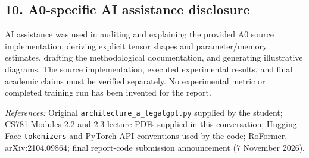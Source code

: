 \subsection{10. A0-specific AI assistance
disclosure}\label{a0-specific-ai-assistance-disclosure}

AI assistance was used in auditing and explaining the provided A0 source
implementation, deriving explicit tensor shapes and parameter/memory
estimates, drafting the methodological documentation, and generating
illustrative diagrams. The source implementation, executed experimental
results, and final academic claims must be verified separately. No
experimental metric or completed training run has been invented for the
report.

\emph{References:} Original \texttt{architecture\_a\_legalgpt.py}
supplied by the student; CS781 Modules 2.2 and 2.3 lecture PDFs supplied
in this conversation; Hugging Face \texttt{tokenizers} and PyTorch API
conventions used by the code; RoFormer, arXiv:2104.09864; final
report-code submission announcement (7 November 2026).
